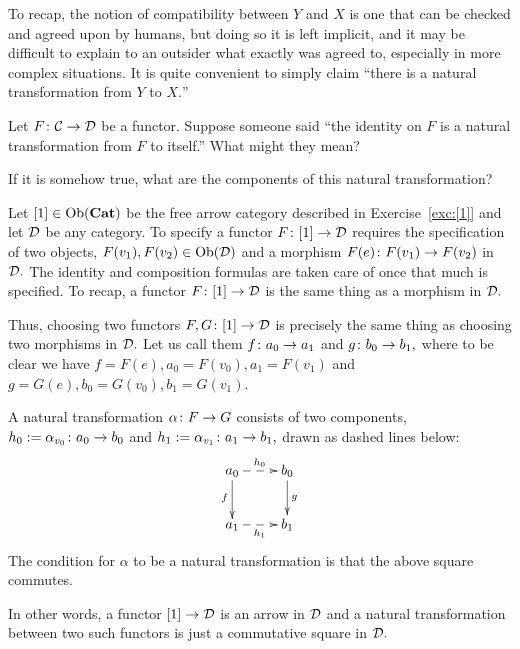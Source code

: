 \documentclass[../main/CT4S-EN-RU]{subfiles}
\begin{document}
\begin{applicationENG}
To recap, the notion of compatibility between $Y$ and $X$ is one that can be checked and agreed upon by humans, but doing so it is left implicit, and it may be difficult to explain to an outsider what exactly was agreed to, especially in more complex situations. It is quite convenient to simply claim “there is a natural transformation from $Y$ to $X.$”
\end{applicationENG}

\begin{applicationRUS}\label{app:change of fsm}
\end{applicationRUS}

\begin{exerciseENG}\label{exc:id nat trans}
Let $F\colon\mathcal{C}\rightarrow\mathcal{D}$ be a functor. Suppose someone said “the identity on $F$ is a natural transformation from $F$ to itself.” \sexc What might they mean?
\item If it is somehow true, what are the components of this natural transformation?
\endsexc
\end{exerciseENG}

\begin{exerciseRUS}\label{exc:id nat trans}
\end{exerciseRUS}

\begin{exampleENG}
Let $[1]\in\operatorname{Ob}({\mathbf{Cat}})$ be the free arrow category described in Exercise~\ref{exc:[1]} and let $\mathcal{D}$ be any category. To specify a functor $F\colon[1]\rightarrow\mathcal{D}$ requires the specification of two objects, $F(v_1), F(v_2)\in\operatorname{Ob}(\mathcal{D})$ and a morphism $F(e)\colon F(v_1)\rightarrow F(v_2)$ in $\mathcal{D}.$ The identity and composition formulas are taken care of once that much is specified. To recap, a functor $F\colon[1]\rightarrow\mathcal{D}$ is the same thing as a morphism in $\mathcal{D}.$

Thus, choosing two functors $F,G\colon[1]\rightarrow\mathcal{D}$ is precisely the same thing as choosing two morphisms in $\mathcal{D}.$ Let us call them $f\colon a_0\rightarrow a_1$ and $g\colon b_0\rightarrow b_1,$ where to be clear we have $f=F(e), a_0=F(v_0), a_1=F(v_1)$ and $g=G(e), b_0=G(v_0), b_1=G(v_1).$ 

A natural transformation $\alpha\colon F\rightarrow G$ consists of two components, $h_0:=\alpha_{v_0}\colon a_0\rightarrow b_0$ and $h_1:=\alpha_{v_1}\colon a_1\rightarrow b_1,$ drawn as dashed lines below:
$$\xymatrix{a_0\ar@{-->}[r]^{h_0}\ar[d]_f&b_0\ar[d]^{g}\\a_1\ar@{-->}[r]_{h_1}&b_1}$$
The condition for $\alpha$ to be a natural transformation is that the above square commutes. 

In other words, a functor $[1]\rightarrow\mathcal{D}$ is an arrow in $\mathcal{D}$ and a natural transformation between two such functors is just a commutative square in $\mathcal{D}.$
\end{exampleENG}
\end{document}
